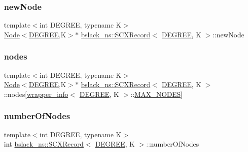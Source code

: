 \subsubsection{\texorpdfstring{new\+Node}{newNode}}
{\footnotesize\ttfamily template$<$int D\+E\+G\+R\+EE, typename K$>$ \\
\hyperlink{structbslack__ns_1_1Node}{Node}$<$\hyperlink{brown__sigouin__abtree__kcas_2adapter_8h_a5d88b17d70c985f2f2b8e987037fd6dd}{D\+E\+G\+R\+EE},K$>$$\ast$ \hyperlink{structbslack__ns_1_1SCXRecord}{bslack\+\_\+ns\+::\+S\+C\+X\+Record}$<$ \hyperlink{brown__sigouin__abtree__kcas_2adapter_8h_a5d88b17d70c985f2f2b8e987037fd6dd}{D\+E\+G\+R\+EE}, K $>$\+::new\+Node}

\mbox{\label{structbslack__ns_1_1SCXRecord_a58efb08f62fc4f1256180880bbc8ca5f}} 
\subsubsection{\texorpdfstring{nodes}{nodes}}
{\footnotesize\ttfamily template$<$int D\+E\+G\+R\+EE, typename K$>$ \\
\hyperlink{structbslack__ns_1_1Node}{Node}$<$\hyperlink{brown__sigouin__abtree__kcas_2adapter_8h_a5d88b17d70c985f2f2b8e987037fd6dd}{D\+E\+G\+R\+EE},K$>$$\ast$ \hyperlink{structbslack__ns_1_1SCXRecord}{bslack\+\_\+ns\+::\+S\+C\+X\+Record}$<$ \hyperlink{brown__sigouin__abtree__kcas_2adapter_8h_a5d88b17d70c985f2f2b8e987037fd6dd}{D\+E\+G\+R\+EE}, K $>$\+::nodes\mbox{[}\hyperlink{classbslack__ns_1_1wrapper__info}{wrapper\+\_\+info}$<$ \hyperlink{brown__sigouin__abtree__kcas_2adapter_8h_a5d88b17d70c985f2f2b8e987037fd6dd}{D\+E\+G\+R\+EE}, K $>$\+::\hyperlink{scxrecord_8h_abd2aacdca9cb2a1a30f3392256b96ea3}{M\+A\+X\+\_\+\+N\+O\+D\+ES}\mbox{]}}

\mbox{\label{structbslack__ns_1_1SCXRecord_a04288a3a72e815697f4cdbf6d3a172ea}} 
\subsubsection{\texorpdfstring{number\+Of\+Nodes}{numberOfNodes}}
{\footnotesize\ttfamily template$<$int D\+E\+G\+R\+EE, typename K$>$ \\
int \hyperlink{structbslack__ns_1_1SCXRecord}{bslack\+\_\+ns\+::\+S\+C\+X\+Record}$<$ \hyperlink{brown__sigouin__abtree__kcas_2adapter_8h_a5d88b17d70c985f2f2b8e987037fd6dd}{D\+E\+G\+R\+EE}, K $>$\+::number\+Of\+Nodes}

